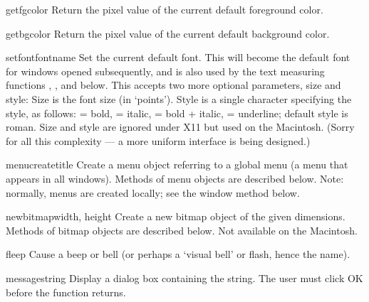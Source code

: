 \begin{funcdesc}{getfgcolor}{}
Return the pixel value of the current default foreground color.
\end{funcdesc}

\begin{funcdesc}{getbgcolor}{}
Return the pixel value of the current default background color.
\end{funcdesc}

\begin{funcdesc}{setfont}{fontname}
Set the current default font.
This will become the default font for windows opened subsequently,
and is also used by the text measuring functions ,
,  and
 below.  This accepts two more optional
parameters, size and style:  Size is the font size (in `points').
Style is a single character specifying the style, as follows:
 = bold,
 = italic,
 = bold + italic,
 = underline;
default style is roman.
Size and style are ignored under X11 but used on the Macintosh.
(Sorry for all this complexity --- a more uniform interface is being designed.)
\end{funcdesc}

\begin{funcdesc}{menucreate}{title}
Create a menu object referring to a global menu (a menu that appears in
all windows).
Methods of menu objects are described below.
Note: normally, menus are created locally; see the window method
 below.
\end{funcdesc}

\begin{funcdesc}{newbitmap}{width, height}
Create a new bitmap object of the given dimensions.
Methods of bitmap objects are described below.
Not available on the Macintosh.
\end{funcdesc}

\begin{funcdesc}{fleep}{}
Cause a beep or bell (or perhaps a `visual bell' or flash, hence the
name).
\end{funcdesc}

\begin{funcdesc}{message}{string}
Display a dialog box containing the string.
The user must click OK before the function returns.
\end{funcdesc}

